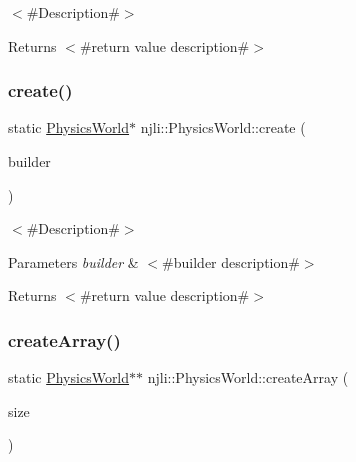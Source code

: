$<$\#\+Description\#$>$

\begin{DoxyReturn}{Returns}
$<$\#return value description\#$>$ 
\end{DoxyReturn}
\mbox{\label{classnjli_1_1_physics_world_a52397ea3dd323182160d9c39ccdb635b}} 
\subsubsection{\texorpdfstring{create()}{create()}\hspace{0.1cm}{\footnotesize\ttfamily [3/3]}}
{\footnotesize\ttfamily static \mbox{\hyperlink{classnjli_1_1_physics_world}{Physics\+World}}$\ast$ njli\+::\+Physics\+World\+::create (\begin{DoxyParamCaption}\item[{const \mbox{\hyperlink{classnjli_1_1_physics_world_builder}{Physics\+World\+Builder}} \&}]{builder }\end{DoxyParamCaption})\hspace{0.3cm}{\ttfamily [static]}}

$<$\#\+Description\#$>$


\begin{DoxyParams}{Parameters}
{\em builder} & $<$\#builder description\#$>$\\
\hline
\end{DoxyParams}
\begin{DoxyReturn}{Returns}
$<$\#return value description\#$>$ 
\end{DoxyReturn}
\mbox{\label{classnjli_1_1_physics_world_a79e85fb35958b4613526181e9c9bdb86}} 
\subsubsection{\texorpdfstring{create\+Array()}{createArray()}}
{\footnotesize\ttfamily static \mbox{\hyperlink{classnjli_1_1_physics_world}{Physics\+World}}$\ast$$\ast$ njli\+::\+Physics\+World\+::create\+Array (\begin{DoxyParamCaption}\item[{const \mbox{\hyperlink{_util_8h_a10e94b422ef0c20dcdec20d31a1f5049}{u32}}}]{size }\end{DoxyParamCaption})\hspace{0.3cm}{\ttfamily [static]}}

